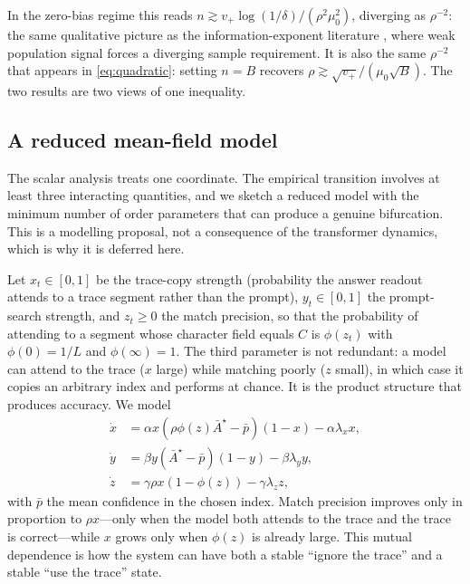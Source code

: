 \documentclass{article}
\theoremstyle{plain}
\theoremstyle{definition}
\theoremstyle{remark}
\newcommand{\1}{\mathbf{1}}
\begin{document}
In the zero-bias regime this reads $n\gtrsim v_+\log(1/\delta)/(\rho^2\mu_0^2)$,
diverging as $\rho^{-2}$: the same qualitative picture as the
information-exponent literature \citep{benarous2021online,abbe2023sgd}, where
weak population signal forces a diverging sample requirement. It is also the same
$\rho^{-2}$ that appears in \eqref{eq:quadratic}: setting $n = B$ recovers
$\rho\gtrsim\sqrt{v_+}/(\mu_0\sqrt B)$. The two results are two views of one
inequality.

\subsection{A reduced mean-field model}
\label{app:meanfield}

The scalar analysis treats one coordinate. The empirical transition involves at
least three interacting quantities, and we sketch a reduced model with the
minimum number of order parameters that can produce a genuine bifurcation. This
is a modelling proposal, not a consequence of the transformer dynamics, which is
why it is deferred here.

Let $x_t\in[0,1]$ be the trace-copy strength (probability the answer readout
attends to a trace segment rather than the prompt), $y_t\in[0,1]$ the
prompt-search strength, and $z_t\ge0$ the match precision, so that the
probability of attending to a segment whose character field equals $C$ is
$\phi(z_t)$ with $\phi(0) = 1/L$ and $\phi(\infty) = 1$. The third parameter is
not redundant: a model can attend to the trace ($x$ large) while matching poorly
($z$ small), in which case it copies an arbitrary index and performs at chance.
It is the product structure that produces accuracy. We model
\begin{align*}
\dot x &= \alpha x(\rho\phi(z)\bar A^\star-\bar p)(1-x)-\alpha\lambda_xx,\\
\dot y &= \beta y(\bar A^\star-\bar p)(1-y)-\beta\lambda_yy,\\
\dot z &= \gamma\rho x(1-\phi(z))-\gamma\lambda_zz,
\end{align*}
with $\bar p$ the mean confidence in the chosen index. Match precision improves
only in proportion to $\rho x$---only when the model both attends to the trace
and the trace is correct---while $x$ grows only when $\phi(z)$ is already large.
This mutual dependence is how the system can have both a stable ``ignore the
trace'' and a stable ``use the trace'' state.
\end{document}
